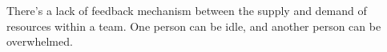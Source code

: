 There's a lack of feedback mechanism between the supply and demand of resources within a team. 
One person can be idle, and another person can be overwhelmed.